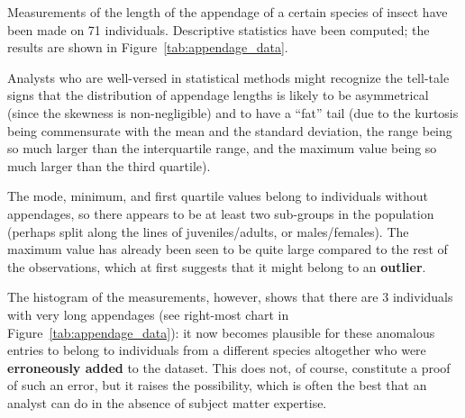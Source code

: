 \begin{Example}
Measurements of the length of the appendage of a certain species of insect have been made on 71 individuals. Descriptive statistics have been computed; the results are shown in Figure~\ref{tab:appendage_data}.

\newpage\noindent Analysts who are well-versed in statistical methods might recognize the tell-tale signs that the distribution of appendage lengths is likely to be asymmetrical (since the skewness is non-negligible) and to have a ``fat'' tail (due to the kurtosis being commensurate with the mean and the standard deviation, the range being so much larger than the interquartile range, and the maximum value being so much larger than the third quartile). \par The mode, minimum, and first quartile values belong to individuals without appendages, so there appears to be at least two sub-groups in the population (perhaps split along the lines of juveniles/adults, or males/females). The maximum value has already been seen to be quite large compared to the rest of the observations, which at first suggests that it might belong to an \textbf{outlier}. \par The histogram of the measurements, however, shows that there are 3 individuals with very long appendages (see right-most chart in Figure~\ref{tab:appendage_data}): it now becomes plausible for these anomalous entries to belong to individuals from a different species altogether who were \textbf{erroneously added} to the dataset. This does not, of course, constitute a proof of such an error, but it raises the possibility, which is often the best that an analyst can do in the absence of subject matter expertise.
\end{Example}